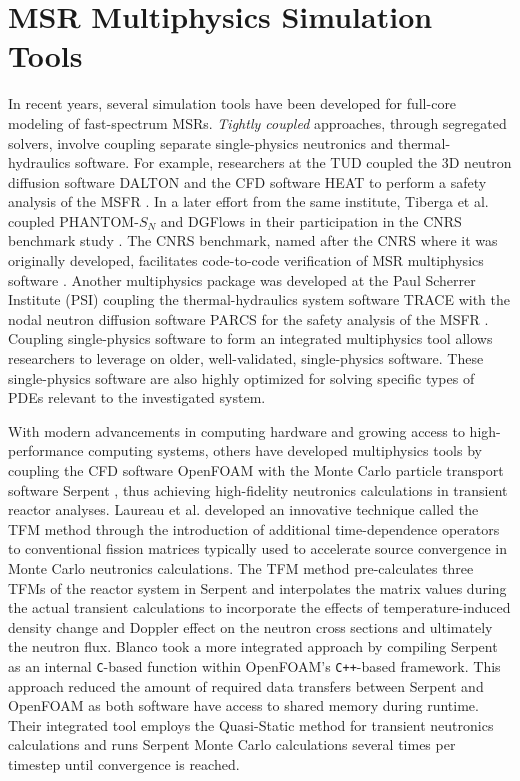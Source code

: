 \section{MSR Multiphysics Simulation Tools} \label{sec:msr-tools}

In recent years, several simulation tools have been developed for full-core
modeling of fast-spectrum \glspl{MSR}. \textit{Tightly coupled} approaches,
through segregated solvers, involve coupling separate single-physics neutronics
and thermal-hydraulics software. For example, researchers at
the \gls{TUD} coupled the 3D neutron diffusion software DALTON
\cite{boer_validation_2010} and the \gls{CFD} software HEAT
\cite{de_zwaan_static_2007} to perform a safety analysis of the \gls{MSFR}
\cite{fiorina_modelling_2014}. In a later effort from the same institute,
Tiberga et al. \cite{tiberga_discontinuous_2019} coupled PHANTOM-$S_N$ and
DGFlows in their participation in the CNRS benchmark study
\cite{tiberga_results_2020}. The CNRS benchmark, named after the \gls{CNRS}
where it was originally developed, facilitates code-to-code verification of
\gls{MSR} multiphysics software \cite{aufiero_testing_2018}. Another
multiphysics package was developed at the Paul Scherrer Institute (PSI)
coupling the thermal-hydraulics system software \gls{TRACE}
\cite{nrc_trace_2007} with the
nodal neutron diffusion software \gls{PARCS} \cite{downar_parcs_2010} for the
safety analysis of the \gls{MSFR} \cite{pettersen_coupled_2016}. Coupling
single-physics software to form an integrated multiphysics tool allows
researchers to leverage on older, well-validated, single-physics software.
These single-physics software are also highly optimized for solving specific
types of \glspl{PDE} relevant to the investigated system.

With modern advancements in computing hardware and growing access to
high-performance computing systems, others have developed multiphysics tools by
coupling the \gls{CFD} software OpenFOAM
\cite{the_openfoam_foundation_ltd_openfoam_2021} with the Monte Carlo particle
transport software
Serpent \cite{leppanen_serpent_2014}, thus achieving high-fidelity neutronics
calculations in transient reactor analyses. Laureau et al.
\cite{laureau_transient_2017} developed an innovative technique called the
\gls{TFM} method through the introduction of additional time-dependence
operators to conventional fission matrices typically used to accelerate source
convergence in Monte Carlo neutronics calculations. The \gls{TFM} method
pre-calculates three \glspl{TFM} of the reactor system in Serpent and
interpolates the matrix values during the actual transient calculations to
incorporate the effects of temperature-induced density change and Doppler
effect on the neutron cross sections and ultimately the neutron flux. Blanco
\cite{blanco_neutronic_2020} took a more integrated approach by
compiling Serpent as an internal \texttt{C}-based function within OpenFOAM's
\texttt{C++}-based framework. This approach reduced the amount of required data
transfers between Serpent and OpenFOAM as both software have access to shared
memory during runtime. Their integrated tool employs the Quasi-Static
method for transient neutronics calculations and runs Serpent Monte Carlo
calculations several times per timestep until convergence is reached.


